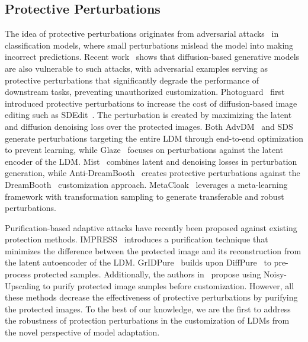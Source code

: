 \subsection{Protective Perturbations}
The idea of protective perturbations originates from adversarial attacks~\cite{goodfellow2014explaining} in classification models, where small perturbations mislead the model into making incorrect predictions. 
Recent work~\cite{salman2023raising,liang2023adversarial,shan2023glaze,van2023anti,liang2023mist,xue2023toward} shows that diffusion-based generative models are also vulnerable to such attacks, with adversarial examples serving as protective perturbations that significantly degrade the performance of downstream tasks, preventing unauthorized customization.
Photoguard~\cite{salman2023raising} first introduced protective perturbations to increase the cost of diffusion-based image editing such as SDEdit~\cite{meng2021sdedit}.
The perturbation is created by maximizing the latent and diffusion denoising loss over the protected images.
Both AdvDM~\cite{liang2023adversarial} and SDS~\cite{xue2023toward} generate perturbations targeting the entire LDM through end-to-end optimization to prevent learning, while Glaze~\cite{shan2023glaze} focuses on perturbations against the latent encoder of the LDM. Mist~\cite{liang2023mist} combines latent and denoising losses in perturbation generation, while Anti-DreamBooth~\cite{van2023anti} creates protective perturbations against the DreamBooth~\cite{ruiz2023dreambooth} customization approach.
MetaCloak~\cite{liu2024metacloak} leverages a meta-learning framework with transformation sampling to generate transferable and robust perturbations.

Purification-based adaptive attacks have recently been proposed against existing protection methods. 
IMPRESS~\cite{cao2024impress} introduces a purification technique that minimizes the difference between the protected image and its reconstruction from the latent autoencoder of the LDM. 
GrIDPure~\cite{zhao2024can} builds upon DiffPure~\cite{nie2022diffusion} to pre-process protected samples. 
Additionally, the authors in~\cite{honig2024adversarial} propose using Noisy-Upscaling to purify protected image samples before customization.
However, all these methods decrease the effectiveness of protective perturbations by purifying the protected images. 
To the best of our knowledge, we are the first to address the robustness of protection perturbations in the customization of LDMs from the novel perspective of model adaptation.